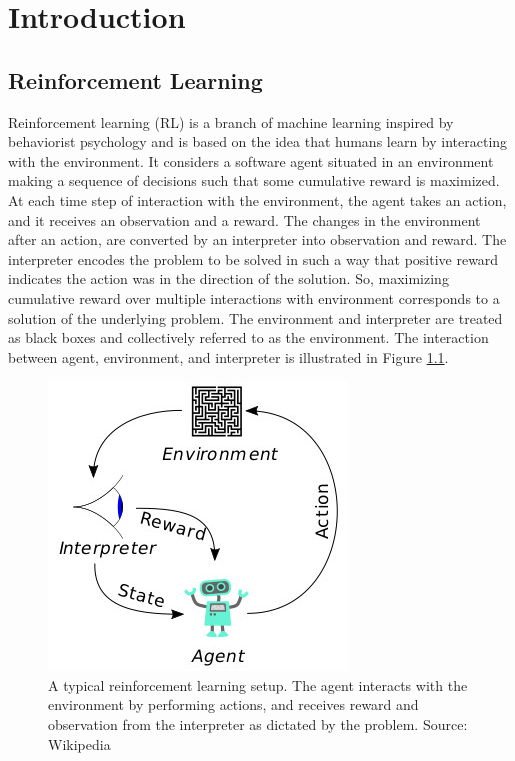 
\chapter{Introduction}\label{chapter:introduction}

\section{Reinforcement Learning}
Reinforcement learning (RL) is a branch of machine learning inspired by behaviorist psychology and is based on the idea that humans learn by interacting with the environment. It considers a software agent situated in an environment making a sequence of decisions such that some cumulative reward is maximized. At each time step of interaction with the environment, the agent takes an action, and it receives an observation and a reward. The changes in the environment after an action, are converted by an interpreter into observation and reward. The interpreter encodes the problem to be solved in such a way that positive reward indicates the action was in the direction of the solution. So, maximizing cumulative reward over multiple interactions with environment corresponds to a solution of the underlying problem. The environment and interpreter are treated as black boxes and collectively referred to as the environment. The interaction between agent, environment, and interpreter is illustrated in Figure \ref{fig:01_rl}.

\begin{figure}[h]
    \centering
    \includegraphics[width=.45\linewidth]{figures/01/rl.jpg}
    \caption{A typical reinforcement learning setup. The agent interacts with the environment by performing actions, and receives reward and observation from the interpreter as dictated by the problem. Source: Wikipedia}
    \label{fig:01_rl}
\end{figure}

